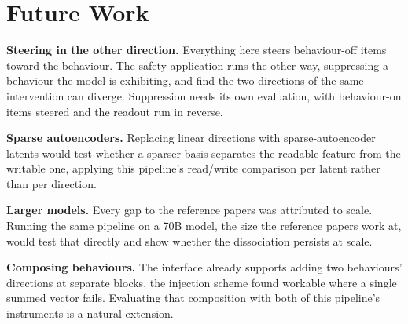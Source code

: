 
\section{Future Work}

\textbf{Steering in the other direction.} Everything here steers
behaviour-off items toward the behaviour. The safety application runs the
other way, suppressing a behaviour the model is exhibiting, and
\citeauthor{marks2024} find the two directions of the same intervention
can diverge. Suppression needs its own evaluation, with behaviour-on items
steered and the readout run in reverse.

\textbf{Sparse autoencoders.} Replacing linear directions with
sparse-autoencoder latents \citep{cunningham2023,bricken2023} would test
whether a sparser basis separates the readable feature from the writable
one, applying this pipeline's read/write comparison per latent rather than
per direction.

\textbf{Larger models.} Every gap to the reference papers was attributed
to scale. Running the same pipeline on a 70B model, the size the reference papers
work at, would test that directly and show whether the dissociation persists
at scale.

\textbf{Composing behaviours.} The interface already supports adding two behaviours'
directions at separate blocks, the injection scheme \citet{vanderweij2024}
found workable where a single summed vector fails. Evaluating that
composition with both of this pipeline's instruments is a natural
extension.
